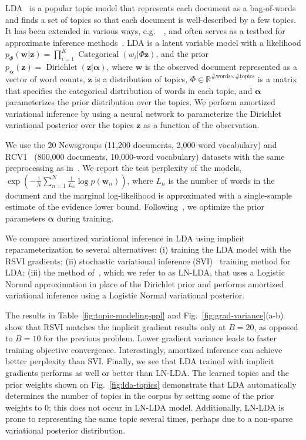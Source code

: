 \documentclass{article}
\let\vec\bm
\newcommand{\eg}{e.g.~}
\begin{document}
LDA~\cite{blei2003latent} is a popular topic model that represents each document as a bag-of-words and finds a set of topics so that each document is well-described by a few topics.
It has been extended in various ways, \eg~\cite{blei2005correlated,blei2006dynamic}, and often serves as a testbed for approximate inference methods~\cite{teh2007collapsed,hoffman2010online,hoffman2013stochastic}.
LDA is a latent variable model with a likelihood $p_{\Phi} (\vec{w} | \vec{z}) = \prod_{i=1}^K \operatorname{Categorical}(w_i | \Phi \vec{z})$, and the prior $p_{\vec{\alpha}} (\vec{z}) = \operatorname{Dirichlet}(\vec{z} | \vec{\alpha})$, where $\vec{w}$ is the observed document represented as a vector of word counts, $\vec{z}$ is a distribution of topics, $\Phi \in \mathbb{R}^{\text{\#words} \times \text{\#topics}}$ is a matrix that specifies the categorical distribution of words in each topic, and $\vec{\alpha}$ parameterizes the prior distribution over the topics.
We perform amortized variational inference by using a neural network to parameterize the Dirichlet variational posterior over the topics $\vec{z}$ as a function of the observation.

We use the 20 Newsgroups (11,200 documents, 2,000-word vocabulary) and RCV1~\cite{lewis2004rcv1} (800,000 documents, 10,000-word vocabulary) datasets with the same preprocessing as in~\cite{srivastava2017autoencoding}.
We report the test perplexity of the models, $\exp\left(-\frac{1}{N} \sum_{n=1}^N \frac{1}{L_n} \log p(\vec{w}_n)\right)$, where $L_n$ is the number of words in the document and the marginal log-likelihood is approximated with a single-sample estimate of the evidence lower bound.
Following~\cite{wallach2009rethinking}, we optimize the prior parameters $\vec{\alpha}$ during training.

We compare amortized variational inference in LDA using implicit reparameterization to several alternatives:
(i) training the LDA model with the RSVI gradients;
(ii) stochastic variational inference (SVI)~\cite{hoffman2013stochastic} training method for LDA;
(iii) the  method of~\citet{srivastava2017autoencoding}, which we refer to as LN-LDA, that uses a Logistic Normal approximation in place of the Dirichlet prior and performs amortized variational inference using a Logistic Normal variational posterior.

The results in Table~\ref{fig:topic-modeling-ppl} and Fig.~\ref{fig:grad-variance}(a-b) show that RSVI matches the implicit gradient results only at $B=20$, as opposed to $B=10$ for the previous problem.
Lower gradient variance leads to faster training objective convergence.
Interestingly, amortized inference can achieve better perplexity than SVI.
Finally, we see that LDA trained with implicit gradients performs as well or better than LN-LDA.
The learned topics and the prior weights shown on Fig.~\ref{fig:lda-topics} demonstrate that LDA automatically determines the number of topics in the corpus by setting some of the prior weights to 0; this does not occur in LN-LDA model.
Additionally, LN-LDA is prone to representing the same topic several times, perhaps due to a non-sparse variational posterior distribution.
\end{document}
